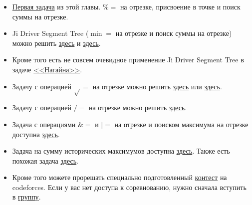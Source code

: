\begin{itemize}
 
    \item \href{https://codeforces.com/contest/438/problem/D}{Первая задача} из этой главы. $\%=$ на отрезке, присвоение в точке и поиск суммы на отрезке.

    \item Ji Driver Segment Tree ($\min=$ на отрезке и поиск суммы на отрезке) можно решить \href{https://vjudge.net/problem/HDU-5306}{здесь} и \href{http://acm.hdu.edu.cn/showproblem.php?pid=5306}{здесь}.

    \item Кроме того есть не совсем очевидное применение Ji Driver Segment Tree в задаче \href{https://codeforces.com/problemset/problem/855/F}{<<Нагайна>>}.

    \item Задачу с операцией $\sqrt{}=$ на отрезке можно решить \href{https://vjudge.net/problem/HDU-5828}{здесь} или \href{http://acm.hdu.edu.cn/showproblem.php?pid=5828}{здесь}.

    \item Задачу с операцией $/=$ на отрезке можно решить \href{https://www.hackerrank.com/challenges/box-operations/problem}{здесь}.

    \item Задача с операциями $\&=$ и $|=$ на отрезке и поиском максимума на отрезке доступна \href{https://csacademy.com/contest/round-70/task/and-or-max/}{здесь}.

    \item Задача на сумму исторических максимумов доступна \href{https://uoj.ac/problem/169}{здесь}. Также есть похожая задача \href{https://www.luogu.com.cn/problem/P4314}{здесь}.

    \item Кроме того можете прорешать специально подготовленный \href{https://codeforces.com/group/1rv4rhCsHp/contest/327313}{контест} на codeforces. Если у вас нет доступа к соревнованию, нужно сначала вступить в \href{https://codeforces.com/group/1rv4rhCsHp/contests}{группу}.
\end{itemize}

